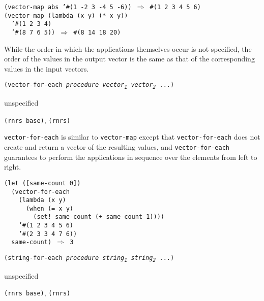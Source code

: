 \begin{alltt}
(vector-map abs '\#{}(1 -2 3 -4 5 -6)) \(\Rightarrow\) \#{}(1 2 3 4 5 6)
(vector-map (lambda (x y) (* x y))
  '\#{}(1 2 3 4)
  '\#{}(8 7 6 5)) \(\Rightarrow\) \#{}(8 14 18 20)
\end{alltt}


While the order in which the applications themselves occur is not
specified, the order of the values in the output vector is the same
as that of the corresponding values in the input vectors.

\begin{description}

\label{control_s47}\item[procedure] \texttt{(vector-for-each \textit{procedure} \textit{vector\textsubscript{1}} \textit{vector\textsubscript{2}} ...)}



\item[returns] unspecified


\item[libraries] \texttt{(rnrs base)}, \texttt{(rnrs)}
\end{description}


\label{control_s48}\label{control_s49}\texttt{vector-for-each} is similar to \texttt{vector-map} except that
\texttt{vector-for-each} does
not create and return a vector of the resulting values, and \texttt{vector-for-each}
guarantees to perform the applications in sequence over the elements from
left to right.


\begin{alltt}
(let ([same-count 0])
  (vector-for-each
    (lambda (x y)
      (when (= x y)
        (set! same-count (+ same-count 1))))
    '\#{}(1 2 3 4 5 6)
    '\#{}(2 3 3 4 7 6))
  same-count) \(\Rightarrow\) 3
\end{alltt}

\begin{description}

\label{control_s50}\item[procedure] \texttt{(string-for-each \textit{procedure} \textit{string\textsubscript{1}} \textit{string\textsubscript{2}} ...)}



\item[returns] unspecified


\item[libraries] \texttt{(rnrs base)}, \texttt{(rnrs)}
\end{description}


